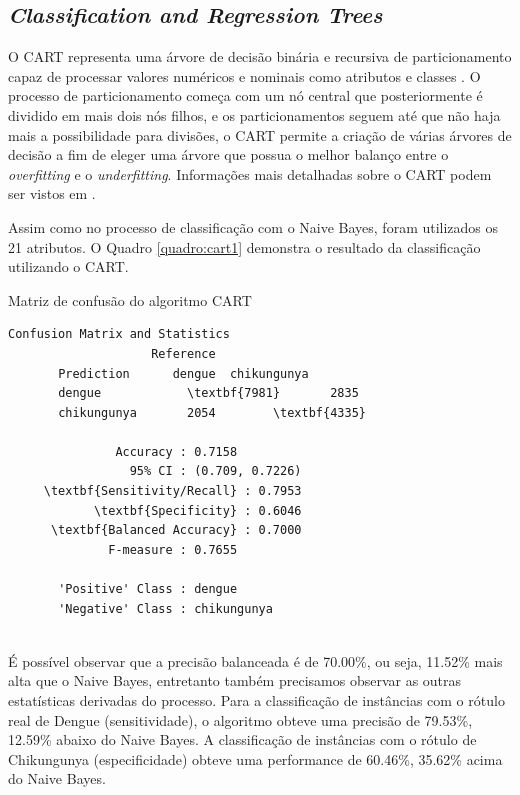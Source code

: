 \subsection{\textit{Classification and Regression Trees}}

O CART representa uma árvore de decisão binária e recursiva de particionamento capaz de processar valores numéricos e nominais como atributos e classes \cite{steinberg2009cart}. O processo de particionamento começa com um nó central que posteriormente é dividido em mais dois nós filhos, e os particionamentos seguem até que não haja mais a possibilidade para divisões, o CART permite a criação de várias árvores de decisão a fim de eleger uma árvore que possua o melhor balanço entre o \textit{overfitting} e o \textit{underfitting}. Informações mais detalhadas sobre o CART podem ser vistos em .

Assim como no processo de classificação com o Naive Bayes, foram utilizados os 21 atributos. O Quadro \ref{quadro:cart1} demonstra o resultado da classificação utilizando o CART.


\begin{quadro}
\caption{\label{quadro:cart1}Matriz de confusão do algoritmo CART}
\begingroup
    \fontsize{10pt}{9pt}\selectfont
    \begin{Verbatim}[commandchars=\\\{\}]
      Confusion Matrix and Statistics
                    Reference
       Prediction      dengue  chikungunya
       dengue            \textbf{7981}       2835
       chikungunya       2054        \textbf{4335}
                                         
               Accuracy : 0.7158         
                 95% CI : (0.709, 0.7226)
     \textbf{Sensitivity/Recall} : 0.7953         
            \textbf{Specificity} : 0.6046         
      \textbf{Balanced Accuracy} : 0.7000
              F-measure : 0.7655        
         
       'Positive' Class : dengue 
       'Negative' Class : chikungunya
  
    \end{Verbatim}  
\endgroup
{}
\end{quadro}

É possível observar que a precisão balanceada é de 70.00\%, ou seja, 11.52\% mais alta que o Naive Bayes, entretanto também precisamos observar as outras estatísticas derivadas do processo. Para a classificação de instâncias com o rótulo real de Dengue (sensitividade), o algoritmo obteve uma precisão de 79.53\%, 12.59\% abaixo do Naive Bayes. A classificação de instâncias com o rótulo de Chikungunya (especificidade) obteve uma performance de 60.46\%, 35.62\% acima do Naive Bayes.

